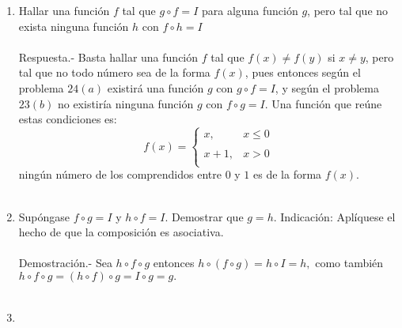 \begin{enumerate}
	\item Hallar una función $f$ tal que $g\circ f=I$ para alguna función $g$, pero tal que no exista ninguna función $h$ con $f\circ h = I$\\\\
	    Respuesta.-\; Basta hallar una función $f$ tal que $f(x)\neq f(y)$ si $x\neq y$, pero tal que no todo número sea de la forma $f(x)$, pues entonces según el problema $24(a)$ existirá una función $g$ con $g\circ f=I$, y según el problema $23(b)$ no existiría ninguna función $g$ con $f\circ g=I$. Una función que reúne estas condiciones es:
	    $$f(x) = \left\{ \begin{array}{lc} 
		x,&x\leq 0\\
		\\ x+1,& x>0\\
	    \end{array}\right.$$
	    ningún número  de los comprendidos entre $0$ y $1$ es de la forma $f(x)$.\\\\

	\item Supóngase $f\circ g = I$ y $h\circ f = I$. Demostrar que $g=h$. Indicación: Aplíquese el hecho de que la composición es asociativa.\\\\
	    Demostración.-\; Sea $h\circ f\circ g$ entonces $h\circ (f \circ g)=h\circ I = h,$ como también $h\circ f \circ g = (h \circ f) \circ g = I \circ g = g.$\\\\ 

	\item 

    \end{enumerate}
